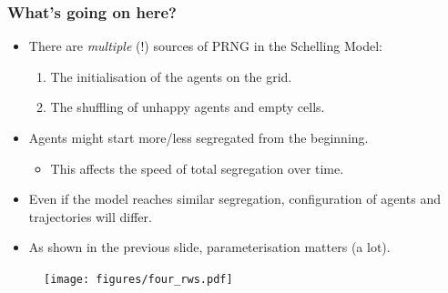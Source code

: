 \documentclass[12pt]{beamer}
\begin{document}
\begin{frame}
\frametitle{What's going on here?}
	\begin{itemize}
	    \item There are \textit{multiple} (!) sources of PRNG in the Schelling Model:\vspace{.1in}
		\begin{enumerate}
			\item The initialisation of the agents on the grid.\vspace{.1in}
			\item The shuffling of unhappy agents and empty cells.\vspace{.1in}
		\end{enumerate}
	\item Agents might start more/less segregated from the beginning.\vspace{.1in}
\begin{itemize}
\item This affects the speed of total segregation over time.\vspace{.1in}
\end{itemize}
	    \item Even if the model reaches similar segregation, configuration of agents and trajectories will differ.\vspace{.1in}
	\item As shown in the previous slide, parameterisation matters (a lot).\vspace{.1in}
	\end{itemize}
\end{frame}


\begin{frame}
	\begin{center}
		\begin{figure}
			\texttt{[image: figures/four\_rws.pdf]}
		\end{figure}
	\end{center}
\end{frame}
\end{document}
